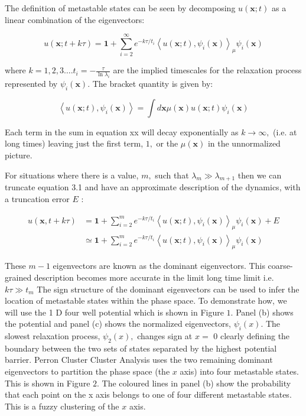 The definition of metastable states can be seen by decomposing $u(\mathbf{x} ; t)$ as a linear combination of the eigenvectors:

\begin{equation}
u(\mathbf{x} ; t+k \tau)=\mathbf{1}+\sum_{i=2}^{\infty} e^{-k \tau / t_{i}}\left\langle u(\mathbf{x} ; t), \psi_{i}(\mathbf{x})\right\rangle_{\mu} \psi_{i}(\mathbf{x})
\end{equation}

where $k=1,2,3 \ldots . t_{i}=-\frac{\tau}{\ln \lambda_{i}}$ are the implied timescales for the relaxation process represented by $\psi_{i}(\mathbf{x}) .$ The bracket quantity is given by:

\begin{equation}
\left\langle u(\mathbf{x} ; t), \psi_{i}(\mathbf{x})\right\rangle=\int d \mathbf{x} \mu(\mathbf{x}) u(\mathbf{x} ; t) \psi_{i}(\mathbf{x})
\end{equation}

Each term in the sum in equation xx will decay exponentially as $k \rightarrow \infty,$ (i.e. at long times) leaving just the first term, $1,$ or the $\mu(\mathbf{x})$ in the unnormalized picture.

For situations where there is a value, $m,$ such that $\lambda_{m} \gg \lambda_{m+1}$ then we can truncate equation 3.1 and have an approximate description of the dynamics, with a truncation error $E$ :

\begin{equation}
\begin{split}
u(\mathbf{x},  t+k \tau) &=\mathbf{1}+\sum_{i=2}^{m} e^{-k \tau / t_{i}}\left\langle u(\mathbf{x} ; t), \psi_{i}(\mathbf{x})\right\rangle_{\mu} \psi_{i}(\mathbf{x})+E \\
& \simeq \mathbf{1}+\sum_{i=2}^{m} e^{-k \tau / t_{i}}\left\langle u(\mathbf{x} ; t), \psi_{i}(\mathbf{x})\right\rangle_{\mu} \psi_{i}(\mathbf{x})
\end{split}
\end{equation}


These $m-1$ eigenvectors are known as the dominant eigenvectors. This coarse-grained description becomes more accurate in the limit long time limit i.e. $k \tau \gg t_{m}$
The sign structure of the dominant eigenvectors can be used to infer the location of metastable states within the phase space. To demonstrate how, we will use the 1 D four well potential which is shown in Figure $1 .$ Panel (b) shows the potential and panel (c) shows the normalized eigenvectors, $\psi_{i}(x) .$ The slowest relaxation process, $\psi_{2}(x),$ changes sign at $x=$ 0 clearly defining the boundary between the two sets of states separated by the highest potential barrier. Perron Cluster Cluster Analysis uses the two remaining dominant eigenvectors to partition the phase space (the $x$ axis) into four metastable states. This is shown in Figure $2 .$ The coloured lines in panel (b) show the probability that each point on the x axis belongs to one of four different metastable states. This is a fuzzy clustering of the $x$ axis.

